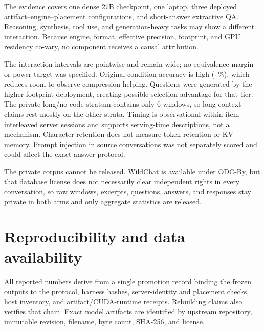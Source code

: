 \documentclass[11pt]{article}
\begin{document}
The evidence covers one dense 27B checkpoint, one laptop, three deployed
artifact--engine--placement configurations, and short-answer extractive QA.
Reasoning, synthesis, tool use, and generation-heavy tasks may show a
different interaction. Because engine, format, effective precision, footprint,
and GPU residency co-vary, no component receives a causal attribution.

The interaction intervals are pointwise and remain wide; no equivalence margin
or power target was specified.
Original-condition accuracy is high
(\PtwoOAccMin--\PtwoOAccMax\%), which reduces room to observe compression
helping. Questions were generated by the higher-footprint deployment, creating
possible selection advantage for that tier. The private long/no-code stratum
contains only 6 windows, so long-context claims rest mostly on the other
strata. Timing is observational within item-interleaved server sessions and
supports serving-time descriptions, not a mechanism. Character retention does
not measure token retention or KV memory. Prompt injection in source
conversations was not separately scored and could affect the exact-answer
protocol.

The private corpus cannot be released. WildChat is available under ODC-By, but
that database license does not necessarily clear independent rights in every
conversation, so raw windows, excerpts, questions, answers, and responses stay
private in both arms and only aggregate statistics are released.

\section{Reproducibility and data availability}\label{sec:repro}

All reported numbers derive from a single promotion record binding the frozen
outputs to the protocol, harness hashes, server-identity and placement checks,
host inventory, and artifact/CUDA-runtime receipts. Rebuilding claims also
verifies that chain. Exact model artifacts are identified by upstream
repository, immutable revision, filename, byte count, SHA-256, and license.
\end{document}
